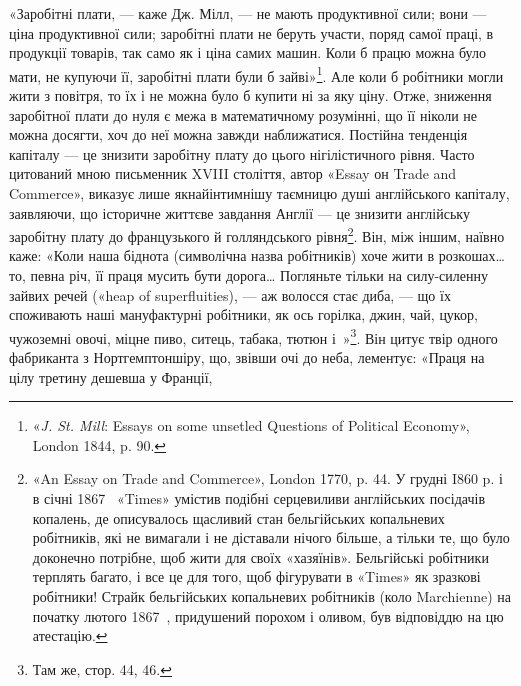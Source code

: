 «Заробітні плати, — каже Дж. Мілл, — не мають продуктивної
сили; вони — ціна продуктивної сили; заробітні плати не
беруть участи, поряд самої праці, в продукції товарів, так само
як і ціна самих машин. Коли б працю можна було мати, не купуючи
її, заробітні плати були б зайві»\footnote{
«\emph{J. St. Mill}: Essays on some unsetled Questions of Political Economy»,
London 1844, p. 90.
}. Але коли б робітники
могли жити з повітря, то їх і не можна було б купити ні за яку ціну.
Отже, зниження заробітної плати до нуля є межа в математичному
розумінні, що її ніколи не можна досягти, хоч до неї можна
завжди наближатися. Постійна тенденція капіталу — це знизити
заробітну плату до цього нігілістичного рівня. Часто цитований
мною письменник XVIII століття, автор «Essay он Trade and
Commerce», виказує лише якнайінтимнішу таємницю душі англійського
капіталу, заявляючи, що історичне життєве завдання
Англії — це знизити англійську заробітну плату до французького
й голляндського рівня\footnote{
«An Essay on Trade and Commerce», London 1770, p. 44. У грудні
I860 p. і в січні 1867~ «Times» умістив подібні серцевиливи англійських
посідачів копалень, де описувалось щасливий стан бельгійських
копальневих робітників, які не вимагали і не діставали нічого більше,
а тільки те, що було доконечно потрібне, щоб жити для своїх «хазяїнів».
Бельгійські робітники терплять багато, і все це для того, щоб фігурувати
в «Times» як зразкові робітники! Страйк бельгійських копальневих
робітників (коло Marchienne) на початку лютого 1867~, придушений
порохом і оливом, був відповіддю на цю атестацію.
}. Він, між іншим, наївно каже: «Коли
наша біднота (символічна назва робітників) хоче жити в розкошах\dots{}
то, певна річ, її праця мусить бути дорога\dots{} Погляньте
тільки на силу-силенну зайвих речей («heap of superfluities), —
аж волосся стає диба, — що їх споживають наші мануфактурні
робітники, як ось горілка, джин, чай, цукор, чужоземні
овочі, міцне пиво, ситець, табака, тютюн і~»\footnote{
Там же, стор. 44, 46.
}. Він цитує
твір одного фабриканта з Нортгемптоншіру, що, звівши очі до
неба, лементує: «Праця на цілу третину дешевша у Франції,
\parbreak{}  %
